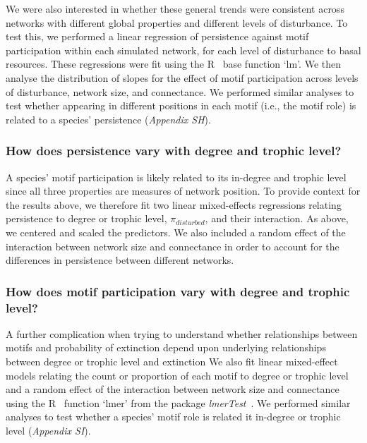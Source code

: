 \documentclass[12pt]{article}
\begin{document}
\begin{spacing}{2.0}
            We were also interested in whether these general trends were consistent across networks with different global properties and different levels of disturbance. 
            To test this, we performed a linear regression of persistence against motif participation within each simulated network, for each level of disturbance to basal resources.
            These regressions were fit using the R~\citep{R} base function `lm'.
            We then analyse the distribution of slopes for the effect of motif participation across levels of disturbance, network size, and connectance. 
            We performed similar analyses to test whether appearing in different positions in each motif (i.e., the motif role) is related to a species' persistence (\emph{Appendix SH}).

        \subsubsection*{How does persistence vary with degree and trophic level?}
        
            A species' motif participation is likely related to its in-degree and trophic level since all three properties are measures of network position.
            To provide context for the results above, we therefore fit two linear mixed-effects regressions relating persistence to degree or trophic level, $\pi_{disturbed}$, and their interaction.
            As above, we centered and scaled the predictors.
            We also included a random effect of the interaction between network size and connectance in order to account for the differences in persistence between different networks. 

        
        \subsubsection*{How does motif participation vary with degree and trophic level?}

            A further complication when trying to understand whether relationships between motifs and probability of extinction depend upon underlying relationships between degree or trophic level and extinction 
            We also fit linear mixed-effect models relating the count or proportion of each motif to degree or trophic level and a random effect of the interaction between network size and connectance using the R~\citep{R} function `lmer' from the package \emph{lmerTest}~\citep{lmerTest}.
            We performed similar analyses to test whether a species' motif role is related it in-degree or trophic level (\emph{Appendix SI}).



\end{spacing}
\end{document}
